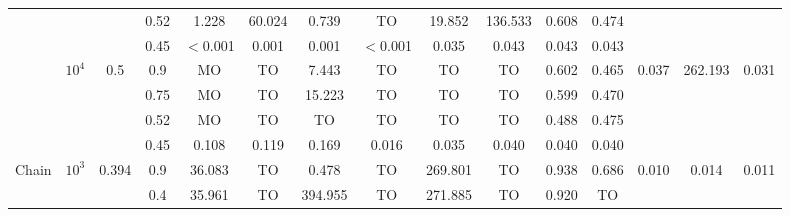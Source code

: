 \begin{table}
\begin{lrbox}{\lstbox}
\begin{minipage}{\textheight}
\begin{tabular}{ccccccccccccccc}
				                                               &                            &                           & 0.52                     & 1.228       & 60.024       & 0.739       & TO       & 19.852  & 136.533 & 0.608   & 0.474                                                                                            \\
				                                               &                            &                           & \cellcolor{gray!25}0.45  & $<$0.001    & 0.001        & 0.001       & $<$0.001 & 0.035   & 0.043   & 0.043   & 0.043                                                                                            \\
				\cmidrule[0.5pt](r){2-15}
				                                               & \multirow{4}{*}{$10^4$}    & \multirow{4}{*}{0.5}      & 0.9                      & MO          & TO           & 7.443       & TO       & TO      & TO      & 0.602   & 0.465   & \multirow{4}{*}{0.037}             & \multirow{4}{*}{262.193} & \multirow{4}{*}{0.031} \\
				                                               &                            &                           & 0.75                     & MO          & TO           & 15.223      & TO       & TO      & TO      & 0.599   & 0.470                                                                                            \\
				                                               &                            &                           & 0.52                     & MO          & TO           & TO          & TO       & TO      & TO      & 0.488   & 0.475                                                                                            \\
				                                               &                            &                           & \cellcolor{gray!25}0.45  & 0.108       & 0.119        & 0.169       & 0.016    & 0.035   & 0.040   & 0.040   & 0.040                                                                                            \\
				\midrule
				\multirow{4}{*}{Chain}                         & \multirow{4}{*}{$10^3$}    & \multirow{4}{*}{0.394}    & 0.9                      & 36.083      & TO           & 0.478       & TO       & 269.801 & TO      & 0.938   & 0.686   & \multirow{4}{*}{0.010}             & \multirow{4}{*}{0.014}   & \multirow{4}{*}{0.011} \\
				                                               &                            &                           & 0.4                      & 35.961      & TO           & 394.955     & TO       & 271.885 & TO      & 0.920   & TO                                                                                               \\

\end{tabular}
\end{minipage}
\end{lrbox}
\end{table}
